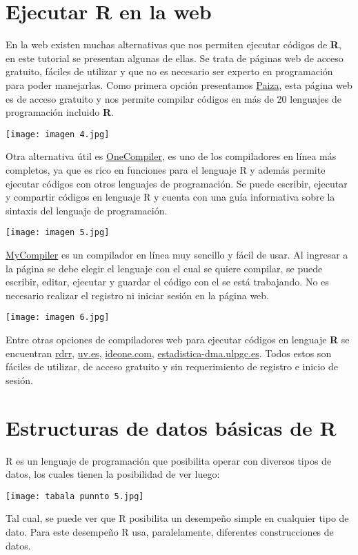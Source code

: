 \documentclass{article}
\begin{document}
\section{Ejecutar R en la web}
En la web existen muchas alternativas que nos permiten ejecutar códigos de \textbf{R}, en este tutorial se presentan algunas de ellas. Se trata de páginas web de acceso gratuito, fáciles de utilizar y que no es necesario ser experto en programación para poder manejarlas.
Como primera opción presentamos \href{https://paiza.io/}{Paiza}, esta página web es de acceso gratuito y nos permite compilar códigos en más de 20 lenguajes de programación incluido \textbf{R}.
\begin{center}
    \texttt{[image: imagen 4.jpg]}
\end{center}
Otra alternativa útil es \href{https://onecompiler.com/r}{OneCompiler}, es uno de los compiladores en línea más completos, ya que es rico en funciones para el lenguaje R  y además permite ejecutar códigos con otros lenguajes de programación. Se puede escribir, ejecutar y compartir códigos en lenguaje R y cuenta con una guía informativa sobre la sintaxis del lenguaje de programación.
\begin{center}
    \texttt{[image: imagen 5.jpg]}
\end{center}
\href{https://www.mycompiler.io/new/r}{MyCompiler} es un compilador en línea muy sencillo y fácil de usar. Al ingresar a la página se debe elegir el lenguaje con el cual se quiere compilar, se puede escribir, editar, ejecutar y guardar el código con el se está trabajando. No es necesario realizar el registro ni iniciar sesión en la página web.
\begin{center}
    \texttt{[image: imagen 6.jpg]}
\end{center}

Entre otras opciones de compiladores web para ejecutar códigos en lenguaje \textbf{R} se encuentran \href{https://rdrr.io/snippets/}{rdrr}, \href{https://www.uv.es/lejarza/eaa/ronline.htm}{uv.es}, \href{https://ideone.com/xfcXHG}{ideone.com}, \href{https://estadistica-dma.ulpgc.es/estadFCM/R_online.html}{estadistica-dma.ulpgc.es}. Todos estos son fáciles de utilizar, de acceso gratuito y sin requerimiento de registro e inicio de sesión.


\section{Estructuras de datos básicas de R}
 R es un lenguaje de programación que posibilita operar con diversos tipos de datos, los cuales tienen la posibilidad de ver luego: 
\begin{center}
\texttt{[image: tabala punnto 5.jpg]}    
\end{center}
Tal cual, se puede ver que R posibilita un desempeño simple en cualquier tipo de dato. Para este desempeño R usa, paralelamente, diferentes construcciones de datos.
\end{document}
